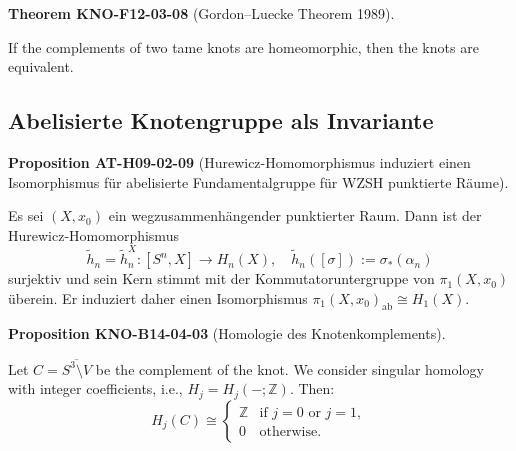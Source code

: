 \documentclass[10pt, letterpaper]{article}
\newcommand{\CustomHeading}[3]{%
  \par\medskip\noindent%
  \textbf{#1 #2} \textnormal{(#3)}.\enskip%
}
\newenvironment{PROP}[2]{\CustomHeading{Proposition}{#1}{#2}}{}
\newenvironment{THEO}[2]{\CustomHeading{Theorem}{#1}{#2}}{}
\begin{document}
\begin{THEO}{KNO-F12-03-08}{Gordon–Luecke Theorem 1989}
If the complements of two tame knots are homeomorphic, then the knots are equivalent.
\end{THEO}

\subsection{Abelisierte Knotengruppe als Invariante}

\begin{PROP}{AT-H09-02-09}{Hurewicz-Homomorphismus induziert einen Isomorphismus für abelisierte Fundamentalgruppe für WZSH punktierte Räume}
Es sei $(X, x_0)$ ein wegzusammenhängender punktierter Raum. Dann ist der Hurewicz-Homomorphismus 
$$\tilde{h}_n=\tilde{h}_n^X:\left[S^n, X\right] \rightarrow H_n(X), \quad \tilde{h}_n([\sigma]):=\sigma_*\left(\alpha_n\right)$$
surjektiv und sein Kern stimmt mit der Kommutatoruntergruppe von $\pi_1\left(X, x_0\right)$ überein. Er induziert daher einen Isomorphismus $\pi_1\left(X, x_0\right)_{\mathrm{ab}} \cong H_1(X)$.
\end{PROP}

\begin{PROP}{KNO-B14-04-03}{Homologie des Knotenkomplements}
Let \( C = \overline{S^3 \setminus V} \) be the complement of the knot. We consider singular homology with integer coefficients, i.e., \( H_j = H_j(-; \mathbb{Z}) \). Then:
\[
H_j(C) \cong
\begin{cases}
\mathbb{Z} & \text{if } j = 0 \text{ or } j = 1, \\
0 & \text{otherwise}.
\end{cases}
\]
\end{PROP}
\end{document}
